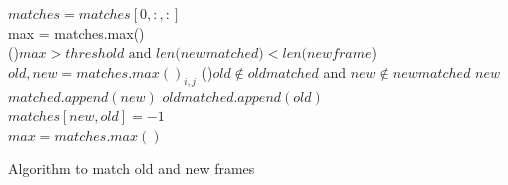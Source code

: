 \documentclass[11pt,twoside]{report}
\begin{document}
\begin{algorithm}
	$matches = matches[0,:,:]$
	\texttt{\\}
	max = matches.max() \texttt{\\}
	\While(){$max > threshold \text{ and } len(new$\textunderscore$matched)<len(new$\textunderscore$frame$)}{
		$old,new = matches.max()_{i,j}$ 
		\uIf(){$old \notin old$\textunderscore$matched$ and $new \notin new$\textunderscore$matched$}{
			$new$\textunderscore$matched.append(new)$ 
			$old$\textunderscore$matched.append(old)$ 
		}
		\texttt{\\}
		$matches[new,old] = -1$ \texttt{\\}
		$max = matches.max()$
	}
	\texttt{\\}
	\caption{Algorithm to match old and new frames}
	\label{alg:weights}
\end{algorithm}




\end{document}
